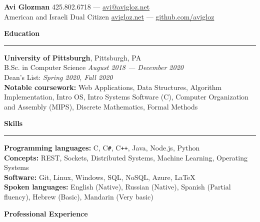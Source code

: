 \documentclass[10pt]{article}
\begin{document}
	\pagestyle{empty}
	\begin{center}
		{\huge \textbf{Avi Glozman}} {\large \hfill 425.802.6718 --- \href{mailto:avi@avigloz.net}{avi@avigloz.net}}\\
		\vspace{1.25mm}
		{\large American and Israeli Dual Citizen \hfill \href{https://avigloz.net}{avigloz.net} --- \href{https://github.com/avigloz}{github.com/avigloz}}
	\end{center}
	
	\begin{flushleft}	
		\vspace{-1.65mm}
		{\large \raggedright \textbf{Education}}
		\vspace{1.25mm}
	
		\hrule
		
		\vspace{2.25mm}
		\textbf{University of Pittsburgh}, Pittsburgh, PA\\
      	{\small B.Sc. in Computer Science \hfill \textit{August 2018 --- December 2020}}\\
		{\small Dean's List: \textit{Spring 2020, Fall 2020}}\\
		{\small \textbf{Notable coursework:} Web Applications, Data Structures, Algorithm Implementation, Intro OS, Intro Systems Software (C), Computer Organization and Assembly (MIPS), Discrete Mathematics, Formal Methods}
	
		\vspace{1.25mm} 
		{\large \raggedright \textbf{Skills}}
		\vspace{1.25mm}
	
		\hrule
	
		\vspace{2.25mm}
		\textbf{Programming languages:} C, C\verb!#!, C\texttt{++}, Java, Node.js, Python\\
		\vspace{0.5mm}
		\textbf{Concepts:} REST, Sockets, Distributed Systems, Machine Learning, Operating Systems\\
		\vspace{0.5mm}
		\textbf{Software:} Git, Linux, Windows, SQL, NoSQL, Azure, \LaTeX\\ 
		\vspace{0.5mm}
		\textbf{Spoken languages:} English (Native), Russian (Native), Spanish (Partial fluency),  Hebrew (Basic), Mandarin (Very basic)

		\vspace{1.5mm}
		{\large \raggedright \textbf{Professional Experience}}
		\vspace{1.25mm}
	

\end{flushleft}
\end{document}
